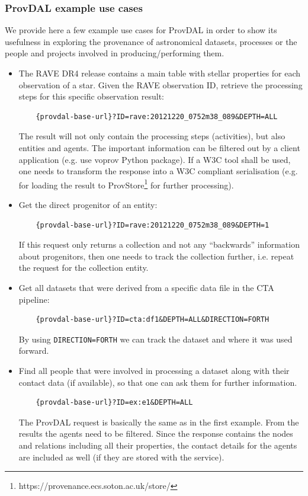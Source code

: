 \subsubsection{ProvDAL example use cases}
We provide here a few example use cases for ProvDAL in order to show its usefulness in exploring the provenance
of astronomical datasets, processes or the people and projects involved in producing/performing them.

\begin{itemize}
\item The RAVE DR4 release contains a main table with stellar properties for each observation of a star. Given the RAVE observation ID, retrieve the processing steps
for this specific observation result:

	\begin{verbatim}
	{provdal-base-url}?ID=rave:20121220_0752m38_089&DEPTH=ALL
	\end{verbatim}

The result will not only contain the processing steps (activities), but also entities and agents. The important information can be filtered out by a client application (e.g. use voprov Python package). If a W3C tool shall be used, one needs to transform the response into a W3C compliant serialisation (e.g. for loading the result to ProvStore\footnote{https://provenance.ecs.soton.ac.uk/store/} for further processing).

\item Get the direct progenitor of an entity:
	\begin{verbatim}
	{provdal-base-url}?ID=rave:20121220_0752m38_089&DEPTH=1
	\end{verbatim}
	If this request only returns a collection and not any ``backwards'' information about progenitors, then
	one needs to track the collection further, i.e. repeat the request for the collection entity.

\item Get all datasets that were derived from a specific data file in the CTA pipeline:
	\begin{verbatim}
	{provdal-base-url}?ID=cta:df1&DEPTH=ALL&DIRECTION=FORTH
	\end{verbatim}
	By using \texttt{DIRECTION=FORTH} we can track the dataset and where it was used forward.

\item Find all people that were involved in processing a dataset along with their contact data (if available), so that one can ask them for further information.
	\begin{verbatim}
	{provdal-base-url}?ID=ex:e1&DEPTH=ALL
	\end{verbatim}
 	The ProvDAL request is basically the same as in the first example. From the results the agents need to be filtered.
 	Since the response contains the nodes and relations including all their properties, the contact details for the agents are included as well (if they are stored with the service).


\end{itemize}

